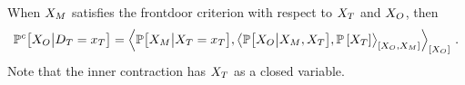 \begin{lemma}
    When $X_{M}$ satisfies the frontdoor criterion with respect to $X_{T}$ and $X_{O}$, %
    then
    \begin{align*}
        \mathbb{P}^{c}\big[X_{O}\big|D_{T}=x_{T}\big]
        = \left\langle 
            \mathbb{P}\big[X_{M}\big|X_{T}=x_{T}\big],
            \left\langle \mathbb{P}\big[X_{O}\big|X_{M},X_{T}\big],\mathbb{P}\left[X_{T}\right]\right\rangle_{\left[ X_{O},X_{M} \right]}
        \right\rangle_{\left[ X_{O} \right]} \, .
    \end{align*}
    Note that the inner contraction has $X_{T}$ as a closed variable.
\end{lemma}
